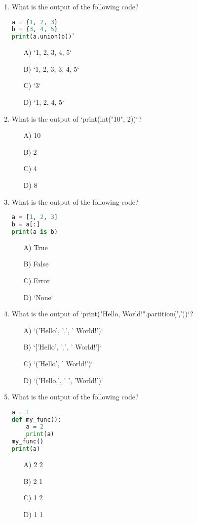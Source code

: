 \documentclass[9pt]{article}
\begin{document}
\begin{multicols}{2}
\begin{enumerate}
\item What is the output of the following code?
\begin{lstlisting}[language=Python]
a = {1, 2, 3}
b = {3, 4, 5}
print(a.union(b))`
\end{lstlisting}
\begin{enumerate}
\item[A)] `{1, 2, 3, 4, 5}`
\item[B)] `{1, 2, 3, 3, 4, 5}`
\item[C)] `{3}`
\item[D)] `{1, 2, 4, 5}`
\end{enumerate}

\item What is the output of `print(int("10", 2))`?
\begin{enumerate}
\item[A)] 10
\item[B)] 2
\item[C)] 4
\item[D)] 8
\end{enumerate}

\item What is the output of the following code?
\begin{lstlisting}[language=Python]
a = [1, 2, 3]
b = a[:]
print(a is b)
\end{lstlisting}
\begin{enumerate}
\item[A)] True
\item[B)] False
\item[C)] Error
\item[D)] `None`
\end{enumerate}

\item What is the output of `print("Hello, World!".partition(','))`?
\begin{enumerate}
\item[A)] `('Hello', ',', ' World!')`
\item[B)] `['Hello', ',', ' World!']`
\item[C)] `('Hello', ' World!')`
\item[D)] `('Hello,', ' ', 'World!')`
\end{enumerate}

\item What is the output of the following code?
\begin{lstlisting}[language=Python]
a = 1
def my_func():
    a = 2
    print(a)
my_func()
print(a)
\end{lstlisting}
\begin{enumerate}
\item[A)] 2 2
\item[B)] 2 1
\item[C)] 1 2
\item[D)] 1 1
\end{enumerate}


\end{enumerate}
\end{multicols}
\end{document}
